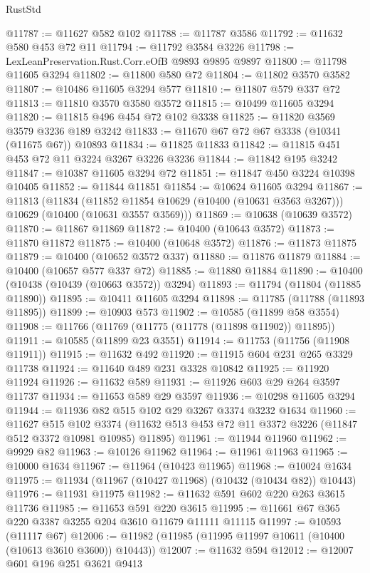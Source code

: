 \begin{lexlean}{RustStd}
\begin{coremodule}
@11787 := @11627 @582 @102
@11788 := @11787 @3586
@11792 := @11632 @580 @453 @72 @11
@11794 := @11792 @3584 @3226
@11798 := LexLeanPreservation.Rust.Corr.eOfB @9893 @9895 @9897
@11800 := @11798 @11605 @3294
@11802 := @11800 @580 @72
@11804 := @11802 @3570 @3582
@11807 := @10486 @11605 @3294 @577
@11810 := @11807 @579 @337 @72
@11813 := @11810 @3570 @3580 @3572
@11815 := @10499 @11605 @3294
@11820 := @11815 @496 @454 @72 @102 @3338
@11825 := @11820 @3569 @3579 @3236 @189 @3242
@11833 := @11670 @67 @72 @67 @3338 (@10341 (@11675 @67)) @10893
@11834 := @11825 @11833
@11842 := @11815 @451 @453 @72 @11 @3224 @3267 @3226 @3236
@11844 := @11842 @195 @3242
@11847 := @10387 @11605 @3294 @72
@11851 := @11847 @450 @3224 @10398 @10405
@11852 := @11844 @11851
@11854 := @10624 @11605 @3294
@11867 := @11813
    (@11834
      (@11852 @11854 @10629 (@10400 (@10631 @3563 @3267)))
      @10629
      (@10400 (@10631 @3557 @3569)))
@11869 := @10638 (@10639 @3572)
@11870 := @11867 @11869
@11872 := @10400 (@10643 @3572)
@11873 := @11870 @11872
@11875 := @10400 (@10648 @3572)
@11876 := @11873 @11875
@11879 := @10400 (@10652 @3572 @337)
@11880 := @11876 @11879
@11884 := @10400 (@10657 @577 @337 @72)
@11885 := @11880 @11884
@11890 := @10400 (@10438 (@10439 (@10663 @3572)) @3294)
@11893 := @11794 (@11804 (@11885 @11890))
@11895 := @10411 @11605 @3294
@11898 := @11785 (@11788 (@11893 @11895))
@11899 := @10903 @573
@11902 := @10585 (@11899 @58 @3554)
@11908 := @11766 (@11769 (@11775 (@11778 (@11898 @11902)) @11895))
@11911 := @10585 (@11899 @23 @3551)
@11914 := @11753 (@11756 (@11908 @11911))
@11915 := @11632 @492
@11920 := @11915 @604 @231 @265 @3329 @11738
@11924 := @11640 @489 @231 @3328 @10842
@11925 := @11920 @11924
@11926 := @11632 @589
@11931 := @11926 @603 @29 @264 @3597 @11737
@11934 := @11653 @589 @29 @3597
@11936 := @10298 @11605 @3294
@11944 := @11936 @82 @515 @102 @29 @3267 @3374 @3232 @1634
@11960 := @11627
    @515
    @102
    @3374
    (@11632 @513 @453 @72 @11 @3372 @3226 (@11847 @512 @3372 @10981 @10985) @11895)
@11961 := @11944 @11960
@11962 := @9929 @82
@11963 := @10126 @11962
@11964 := @11961 @11963
@11965 := @10000 @1634
@11967 := @11964 (@10423 @11965)
@11968 := @10024 @1634
@11975 := @11934 (@11967 (@10427 @11968) (@10432 (@10434 @82)) @10443)
@11976 := @11931 @11975
@11982 := @11632 @591 @602 @220 @263 @3615 @11736
@11985 := @11653 @591 @220 @3615
@11995 := @11661 @67 @365 @220 @3387 @3255 @204 @3610 @11679 @11111 @11115
@11997 := @10593 (@11117 @67)
@12006 := @11982 (@11985 (@11995 @11997 @10611 (@10400 (@10613 @3610 @3600)) @10443))
@12007 := @11632 @594
@12012 := @12007 @601 @196 @251 @3621 @9413

\end{coremodule}
\end{lexlean}
